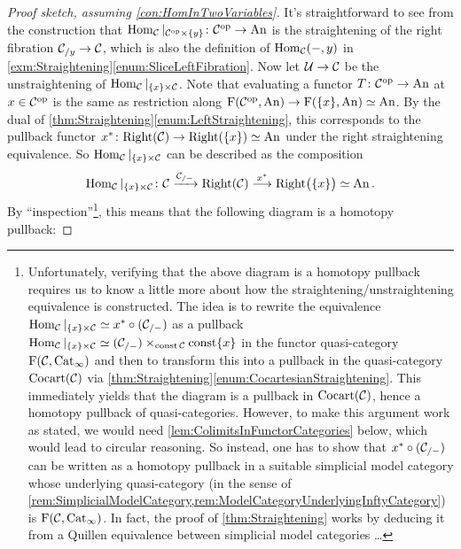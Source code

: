 \begin{proof}[Proof sketch, assuming \cref{con:HomInTwoVariables}]
	It's straightforward to see from the construction that $\operatorname{Hom}_{\mathcal{C}}|_{\mathcal{C}^{\mathrm{op}}\times\{y\}}\colon \mathcal{C}^{\mathrm{op}}\rightarrow\mathrm{An}$ is the straightening of the right fibration $\mathcal{C}_{/y}\rightarrow \mathcal{C}$, which is also the definition of $\operatorname{Hom}_{\mathcal{C}}(-,y)$ in \cref{exm:Straightening}\cref{enum:SliceLeftFibration}. Now let $\mathcal{U}\rightarrow\mathcal{C}$ be the unstraightening of $\operatorname{Hom}_{\mathcal{C}}|_{\{x\}\times\mathcal{C}}$. Note that evaluating a functor $T\colon\mathcal{C}^{\mathrm{op}}\rightarrow\mathrm{An}$ at $x\in \mathcal{C}^{\mathrm{op}}$ is the same as restriction along $\operatorname{F}(\mathcal{C}^{\mathrm{op}},\mathrm{An})\rightarrow\operatorname{F}(\{x\},\mathrm{An})\simeq \mathrm{An}$. By the dual of \cref{thm:Straightening}\cref{enum:LeftStraightening}, this corresponds to the pullback functor $x^*\colon \mathrm{Right}(\mathcal{C})\rightarrow\mathrm{Right}(\{x\})\simeq \mathrm{An}$ under the right straightening equivalence. So $\operatorname{Hom}_{\mathcal{C}}|_{\{x\}\times\mathcal{C}}$ can be described as the composition
	\begin{equation*}
		\operatorname{Hom}_{\mathcal{C}}|_{\{x\}\times\mathcal{C}}\colon\mathcal{C}\xrightarrow{\mathcal{C}_{/-}}\mathrm{Right}(\mathcal{C})\overset{x^*}{\longrightarrow}\mathrm{Right}\bigl(\{x\}\bigr)\simeq \mathrm{An}\,.
	\end{equation*}
	By \enquote{inspection}\footnote{Unfortunately, verifying that the above diagram is a homotopy pullback requires us to know a little more about how the straightening/unstraightening equivalence is constructed. The idea is to rewrite the equivalence $\operatorname{Hom}_{\mathcal{C}}|_{\{x\}\times\mathcal{C}}\simeq x^*\circ (\mathcal{C}_{/-})$ as a pullback $\operatorname{Hom}_{\mathcal{C}}|_{\{x\}\times\mathcal{C}}\simeq (\mathcal{C}_{/-})\times_{\operatorname{const} \mathcal{C}}\operatorname{const} \{x\}$ in the functor quasi-category $\operatorname{F}(\mathcal{C},\mathrm{Cat}_\infty)$ and then to transform this into a pullback in the quasi-category $\mathrm{Cocart}(\mathcal{C})$ via \cref{thm:Straightening}\cref{enum:CocartesianStraightening}. This immediately yields that the diagram is a pullback in $\mathrm{Cocart}(\mathcal{C})$, hence a homotopy pullback of quasi-categories. However, to make this argument work as stated, we would need \cref{lem:ColimitsInFunctorCategories} below, which would lead to circular reasoning. So instead, one has to show that $x^*\circ (\mathcal{C}_{/-})$ can be written as a homotopy pullback in a suitable simplicial model category whose underlying quasi-category (in the sense of \cref{rem:SimplicialModelCategory,rem:ModelCategoryUnderlyingInftyCategory}) is $\operatorname{F}(\mathcal{C},\mathrm{Cat}_\infty)$. In fact, the proof of \cref{thm:Straightening} works by deducing it from a Quillen equivalence between simplicial model categories \ldots
	}, this means that the following diagram is a homotopy pullback:

\end{proof}
